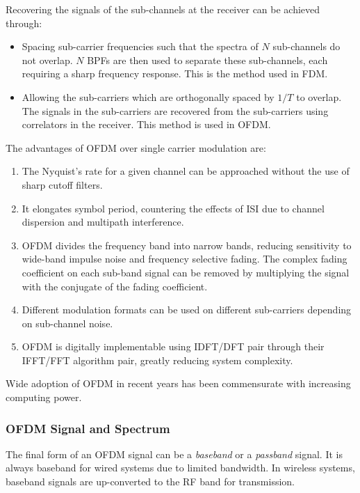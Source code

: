 Recovering the signals of the sub-channels at the receiver can be achieved through:
\begin{itemize}
	\item Spacing sub-carrier frequencies such that the spectra of \(N\) sub-channels do not overlap. \(N\) \gls{BPF}s are then used to separate these sub-channels, each requiring a sharp frequency response. This is the method used in \gls{FDM}.
	\item Allowing the sub-carriers which are orthogonally spaced by \(1/T\) to overlap. The signals in the sub-carriers are recovered from the sub-carriers using correlators in the receiver. This method is used in \gls{OFDM}.
\end{itemize}
The advantages of \gls{OFDM} over single carrier modulation are:
\begin{enumerate}
	\item The Nyquist's rate for a given channel can be approached without the use of sharp cutoff filters.
	\item It elongates symbol period, countering the effects of \gls{ISI} due to channel dispersion and multipath interference.
	\item OFDM divides the frequency band into narrow bands, reducing sensitivity to wide-band impulse noise and frequency selective fading. The complex fading coefficient on each sub-band signal can be removed by multiplying the signal with the conjugate of the fading coefficient.
	\item Different modulation formats can be used on different sub-carriers depending on sub-channel noise.
	\item OFDM is digitally implementable using \gls{IDFT}/\gls{DFT} pair through their \gls{IFFT}/\gls{FFT} algorithm pair, greatly reducing system complexity.
\end{enumerate}
Wide adoption of OFDM in recent years has been commensurate with increasing computing power.

\subsubsection{OFDM Signal and Spectrum}
The final form of an OFDM signal can be a \emph{baseband} or a \emph{passband} signal. It is always baseband for wired systems due to limited bandwidth. In wireless systems, baseband signals are up-converted to the \gls{RF} band for transmission.
